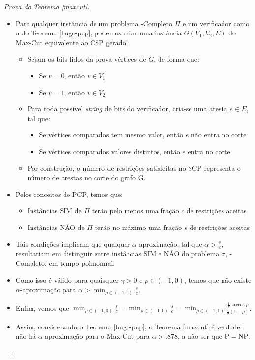 \documentclass[12pt,a4paper]{article}
\begin{document}
\begin{proof}[Prova do Teorema \ref{maxcut}]

\begin{itemize}
    \item Para qualquer instância de um problema \np-Completo $\Pi$ e um verificador como o do Teorema \ref{bugc-pcp}, podemos criar uma instância $G(V_1,V_2,E)$ do Max-Cut equivalente ao CSP gerado:
    \begin{itemize}
        \item Sejam os bits lidos da prova vértices de $G$, de forma que:
            \begin{itemize}
                \item Se $v=0$, então $v \in V_1$
                \item Se $v=1$, então $v \in V_2$
            \end{itemize}
        \item Para toda possível \textit{string} de bits do verificador, cria-se uma aresta $e\in E$, tal que:
            \begin{itemize}
                \item Se vértices comparados tem mesmo valor, então $e$ não entra no corte
                \item Se vértices comparados valores distintos, então $e$ entra no corte
            \end{itemize}
        \item Por construção, o número de restrições satisfeitas no SCP representa o número de arestas no corte do grafo G.
    \end{itemize}
    \item Pelos conceitos de PCP, temos que:
        \begin{itemize}
            \item Instâncias SIM de $\Pi$ terão pelo menos uma fração $c$ de restrições aceitas
            \item Instâncias NÃO de $\Pi$ terão no máximo uma fração $s$ de restrições aceitas
        \end{itemize}
    \item Tais condições implicam que qualquer $\alpha$-aproximação, tal que $\alpha > \frac{s}{c}$, resultariam em distinguir entre instâncias SIM e NÃO do problema $\pi$, \np-Completo, em tempo polinomial.
    \item Como isso é válido para quaisquer $\gamma > 0$ e $\rho \in (-1,0)$, temos que não existe $\alpha$-aproximação para $\alpha > \min_{\rho \in (-1,0)} \frac{s}{c}$.
    \item Enfim, vemos que $\min_{\rho \in (-1,0)} \frac{s}{c} = \min_{\rho \in (-1,1)} \frac{s}{c}= \min_{\rho \in (-1,1)} \frac{\frac{1}{\pi} \arccos{\rho}}{\frac{1}{2}(1-\rho)}$.
    \item Assim, considerando o Teorema \ref{bugc-pcp}, o Teorema \ref{maxcut} é verdade: não há $\alpha$-aproximação para o Max-Cut para $\alpha > .878$, a não ser que $\mathrm{P}=\mathrm{NP}$.
\end{itemize}
\end{proof}
\end{document}
